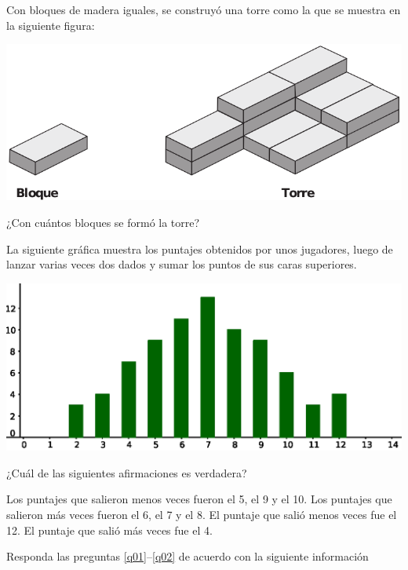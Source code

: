 \documentclass[10pt,addpoints]{exam}
\begin{document}
\begin{multicols}{2}
\begin{questions}
\question Con bloques de madera iguales, se construyó una torre como la que se muestra en la siguiente figura:
\begin{center}
\includegraphics[scale=.2]{Images/Pantallazo-15.png} 
\end{center}
¿Con cuántos bloques se formó la torre?

\begin{oneparchoices}
\end{oneparchoices}
\question
La siguiente gráfica muestra los puntajes obtenidos por unos jugadores, luego de lanzar varias veces dos dados y sumar los puntos de sus caras superiores.
\begin{center}
\includegraphics[scale=.55]{Images/diag-barras.eps} 
\end{center}
¿Cuál de las siguientes afirmaciones es verdadera?
\begin{choices}
\choice Los puntajes que salieron menos veces fueron el 5, el 9 y el 10.
\CorrectChoice Los puntajes que salieron más veces fueron el 6, el 7 y el 8.
\choice El puntaje que salió menos veces fue el 12.
\choice El puntaje que salió más veces fue el 4.
\end{choices}
Responda las preguntas \ref{q01}--\ref{q02} de acuerdo con la siguiente información


\end{questions}
\end{multicols}
\end{document}
